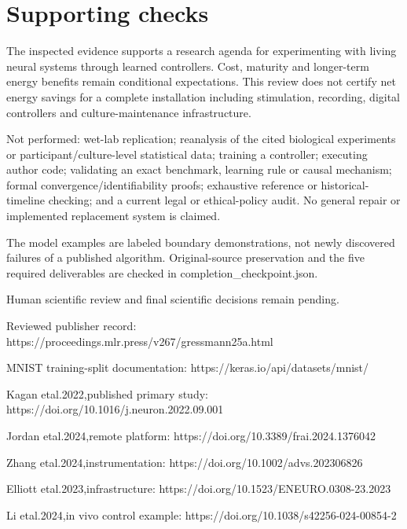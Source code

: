 \documentclass[10pt]{article}
\begin{document}
\section*{Supporting checks}
The inspected evidence supports a research agenda for experimenting with living neural systems through learned controllers. Cost, maturity and longer-term energy benefits remain conditional expectations. This review does not certify net energy savings for a complete installation including stimulation, recording, digital controllers and culture-maintenance infrastructure.\par
Not performed: wet-lab replication; reanalysis of the cited biological experiments or participant/culture-level statistical data; training a controller; executing author code; validating an exact benchmark, learning rule or causal mechanism; formal convergence/identifiability proofs; exhaustive reference or historical-timeline checking; and a current legal or ethical-policy audit. No general repair or implemented replacement system is claimed.\par
The model examples are labeled boundary demonstrations, not newly discovered failures of a published algorithm. Original-source preservation and the five required deliverables are checked in completion\_checkpoint.json.\par
Human scientific review and final scientific decisions remain pending.\par
Reviewed publisher record: https://proceedings.mlr.press/v267/gressmann25a.html\par
MNIST training-split documentation: https://keras.io/api/datasets/mnist/\par
Kagan etal.2022,published primary study: https://doi.org/10.1016/j.neuron.2022.09.001\par
Jordan etal.2024,remote platform: https://doi.org/10.3389/frai.2024.1376042\par
Zhang etal.2024,instrumentation: https://doi.org/10.1002/advs.202306826\par
Elliott etal.2023,infrastructure: https://doi.org/10.1523/ENEURO.0308-23.2023\par
Li etal.2024,in vivo control example: https://doi.org/10.1038/s42256-024-00854-2\par
\end{document}
